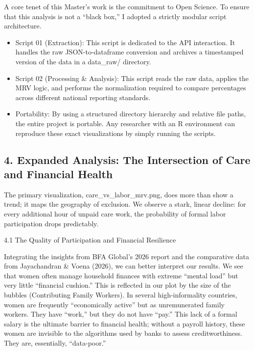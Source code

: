 \documentclass[
  letterpaper,
  DIV=11,
  numbers=noendperiod]{scrartcl}
\begin{document}
A core tenet of this Master's work is the commitment to Open Science. To
ensure that this analysis is not a ``black box,'' I adopted a strictly
modular script architecture.

\begin{itemize}
\item
  Script 01 (Extraction): This script is dedicated to the API
  interaction. It handles the raw JSON-to-dataframe conversion and
  archives a timestamped version of the data in a data\_raw/ directory.
\item
  Script 02 (Processing \& Analysis): This script reads the raw data,
  applies the MRV logic, and performs the normalization required to
  compare percentages across different national reporting standards.
\item
  Portability: By using a structured directory hierarchy and relative
  file paths, the entire project is portable. Any researcher with an R
  environment can reproduce these exact visualizations by simply running
  the scripts.
\end{itemize}

\subsection{4. Expanded Analysis: The Intersection of Care and Financial
Health}\label{expanded-analysis-the-intersection-of-care-and-financial-health}

The primary visualization, care\_vs\_labor\_mrv.png, does more than show
a trend; it maps the geography of exclusion. We observe a stark, linear
decline: for every additional hour of unpaid care work, the probability
of formal labor participation drops predictably.

4.1 The Quality of Participation and Financial Resilience

Integrating the insights from BFA Global's 2026 report and the
comparative data from Jayachandran \& Voena (2026), we can better
interpret our results. We see that women often manage household finances
with extreme ``mental load'' but very little ``financial cushion.'' This
is reflected in our plot by the size of the bubbles (Contributing Family
Workers). In several high-informality countries, women are frequently
``economically active'' but as unremunerated family workers. They have
``work,'' but they do not have ``pay.'' This lack of a formal salary is
the ultimate barrier to financial health; without a payroll history,
these women are invisible to the algorithms used by banks to assess
creditworthiness. They are, essentially, ``data-poor.''
\end{document}
